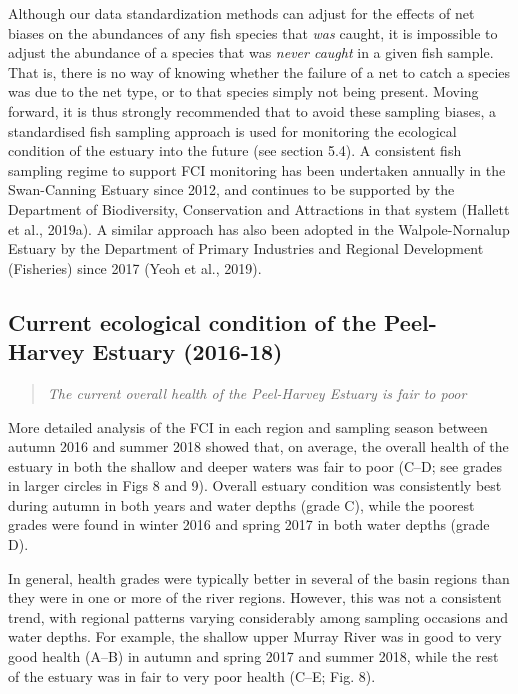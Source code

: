 \documentclass[
]{book}
\begin{document}
Although our data standardization methods can adjust for the effects of net biases on the abundances of any fish species that \emph{was} caught, it is impossible to adjust the abundance of a species that was \emph{never caught} in a given fish sample. That is, there is no way of knowing whether the failure of a net to catch a species was due to the net type, or to that species simply not being present. Moving forward, it is thus strongly recommended that to avoid these sampling biases, a standardised fish sampling approach is used for monitoring the ecological condition of the estuary into the future (see section 5.4). A consistent fish sampling regime to support FCI monitoring has been undertaken annually in the Swan-Canning Estuary since 2012, and continues to be supported by the Department of Biodiversity, Conservation and Attractions in that system (Hallett et al., 2019a). A similar approach has also been adopted in the Walpole-Nornalup Estuary by the Department of Primary Industries and Regional Development (Fisheries) since 2017 (Yeoh et al., 2019).

\hypertarget{current-ecological-condition-of-the-peel-harvey-estuary-2016-18}{%
\subsection{Current ecological condition of the Peel-Harvey Estuary (2016-18)}\label{current-ecological-condition-of-the-peel-harvey-estuary-2016-18}}

\begin{quote}
\emph{The current overall health of the Peel-Harvey Estuary is fair to poor}
\end{quote}

More detailed analysis of the FCI in each region and sampling season between autumn 2016 and summer 2018 showed that, on average, the overall health of the estuary in both the shallow and deeper waters was fair to poor (C--D; see grades in larger circles in Figs 8 and 9). Overall estuary condition was consistently best during autumn in both years and water depths (grade C), while the poorest grades were found in winter 2016 and spring 2017 in both water depths (grade D).

In general, health grades were typically better in several of the basin regions than they were in one or more of the river regions. However, this was not a consistent trend, with regional patterns varying considerably among sampling occasions and water depths. For example, the shallow upper Murray River was in good to very good health (A--B) in autumn and spring 2017 and summer 2018, while the rest of the estuary was in fair to very poor health (C--E; Fig. 8).
\end{document}
